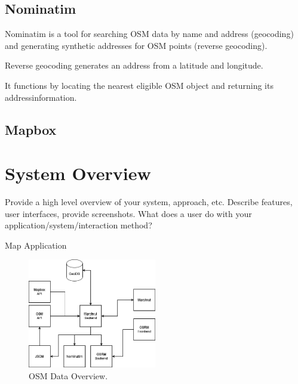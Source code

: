 

\subsection{Nominatim}

Nominatim is a tool for searching OSM data by name and address (geocoding) and generating synthetic addresses for OSM points (reverse geocoding). 


Reverse geocoding generates an address from a latitude and longitude.

It functions by locating the nearest eligible OSM object and returning its addressinformation. 




\subsection{Mapbox}


\section{System Overview}

Provide a high level overview of your system, approach, etc. 
Describe features, user interfaces, provide screenshots.
What does a user do with your application/system/interaction method?

Map Application

\begin{figure}[t]
  \centering
  \includegraphics[width=0.5\textwidth]{images/SystemOverview.png}
  \caption{
  OSM Data Overview.
  }
  \label{figure:SystemOverview}
\end{figure}

